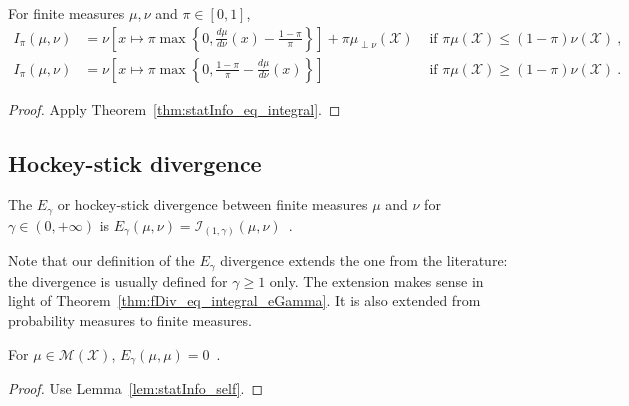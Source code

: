 \begin{lemma}
  \label{lem:deGrootInfo_eq_integral}
  For finite measures $\mu, \nu$ and $\pi \in [0,1]$,
  \begin{align*}
  I_\pi(\mu, \nu)
  &= \nu\left[ x \mapsto \pi \max \left\{0 , \frac{d \mu}{d\nu}(x) - \frac{1 - \pi}{\pi} \right\} \right] + \pi \mu_{\perp \nu}(\mathcal X) & \text{ if } \pi \mu(\mathcal X) \le (1 - \pi) \nu(\mathcal X)
  \: , \\
  I_\pi(\mu, \nu)
  &= \nu\left[ x \mapsto \pi \max \left\{0 , \frac{1 - \pi}{\pi} - \frac{d \mu}{d\nu}(x) \right\} \right] & \text{ if } \pi \mu(\mathcal X) \ge (1 - \pi) \nu(\mathcal X)
  \: .
  \end{align*}
\end{lemma}

\begin{proof}%
{}
Apply Theorem~\ref{thm:statInfo_eq_integral}.
\end{proof}




\subsection{Hockey-stick divergence}


\begin{definition}
  \label{def:eGamma}
  \leanok
  The $E_\gamma$ or hockey-stick divergence between finite measures $\mu$ and $\nu$ for $\gamma \in (0,+\infty)$ is $E_\gamma(\mu, \nu) = \mathcal I_{(1,\gamma)}(\mu, \nu)$~.
\end{definition}

Note that our definition of the $E_\gamma$ divergence extends the one from the literature: the divergence is usually defined for $\gamma \ge 1$ only.
The extension makes sense in light of Theorem~\ref{thm:fDiv_eq_integral_eGamma}.
It is also extended from probability measures to finite measures.

\begin{lemma}
  \label{lem:eGamma_self}
  For $\mu \in \mathcal M(\mathcal X)$, $E_\gamma(\mu, \mu) = 0$~.
\end{lemma}

\begin{proof}%
{}
Use Lemma~\ref{lem:statInfo_self}.
\end{proof}

